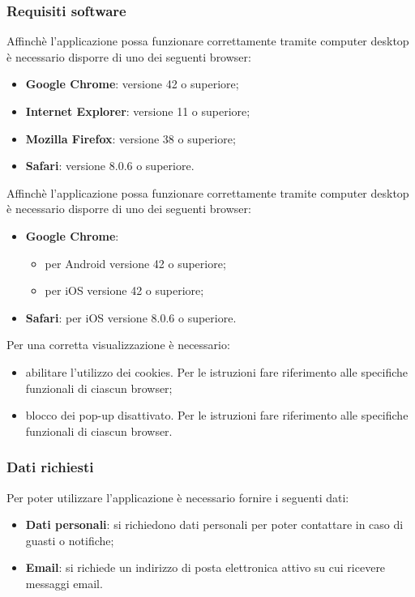 		\subsubsection{Requisiti software} %
		\label{sec:requisiti_software}
			Affinchè l'applicazione possa funzionare correttamente tramite computer desktop è necessario disporre di uno dei seguenti browser:
			\begin{itemize}
				\item \textbf{Google Chrome}: versione 42 o superiore;
				\item \textbf{Internet Explorer}: versione 11 o superiore;
				\item \textbf{Mozilla Firefox}: versione 38 o superiore;
				\item \textbf{Safari}: versione 8.0.6 o superiore.
			\end{itemize}

			Affinchè l'applicazione possa funzionare correttamente tramite computer desktop è necessario disporre di uno dei seguenti browser:
			\begin{itemize}
				\item \textbf{Google Chrome}:
				\begin{itemize}
					\item per Android versione 42 o superiore;
					\item per iOS versione 42 o superiore;
				\end{itemize}
			\item \textbf{Safari}: per iOS versione 8.0.6 o superiore.
			\end{itemize}

			Per una corretta visualizzazione è necessario:
			\begin{itemize}
				\item abilitare l'utilizzo dei cookies. Per le istruzioni fare riferimento alle specifiche funzionali di ciascun browser;
				\item blocco dei pop-up disattivato. Per le istruzioni fare riferimento alle specifiche funzionali di ciascun browser.
			\end{itemize}


		\subsubsection{Dati richiesti} %
		\label{sec:dati_richiesti}
			Per poter utilizzare l'applicazione è necessario fornire i seguenti dati:
			\begin{itemize}
				\item \textbf{Dati personali}: si richiedono dati personali per poter contattare in caso di guasti o notifiche;
				\item \textbf{Email}: si richiede un indirizzo di posta elettronica attivo su cui ricevere messaggi email.
			\end{itemize}


